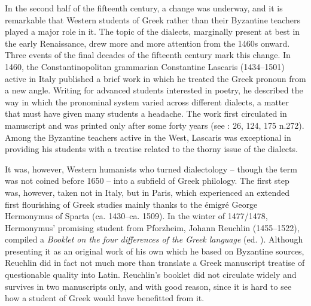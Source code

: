 In the second half of the fifteenth century, a change was underway, and it is remarkable that Western students of Greek rather than their Byzantine teachers played a major role in it. The topic of the dialects, marginally present at best in the early Renaissance, drew more and more attention from the 1460s onward. Three events of the final decades of the fifteenth century mark this change. In 1460, the Constantinopolitan grammarian Constantine Lascaris (1434–1501) active in Italy published a brief work in which he treated the Greek pronoun from a new angle. Writing for advanced students interested in poetry, he described the way in which the pronominal system varied across different dialects, a matter that must have given many students a headache. The work first circulated in manuscript and was printed only after some forty years (see \citealt{Botley2010}: 26, 124, 175 n.272). Among the Byzantine teachers active in the West, Lascaris was exceptional in providing his students with a treatise related to the thorny issue of the dialects.

It was, however, Western humanists who turned dialectology – though the term was not coined before 1650 – into a subfield of Greek philology. The first step was, however, taken not in Italy, but in Paris, which experienced an extended first flourishing of Greek studies mainly thanks to the émigré George Hermonymus of Sparta (ca. 1430–ca. 1509). In the winter of 1477/1478, Hermonymus’ promising student from Pforzheim, Johann Reuchlin (1455–1522), compiled a \textit{Booklet on the four differences of the Greek language} (ed. \citealt{VanRooy2014}). Although presenting it as an original work of his own which he based on Byzantine sources, Reuchlin did in fact not much more than translate a Greek manuscript treatise of questionable quality into Latin. Reuchlin’s booklet did not circulate widely and survives in two manuscripts only, and with good reason, since it is hard to see how a student of Greek would have benefitted from it.


